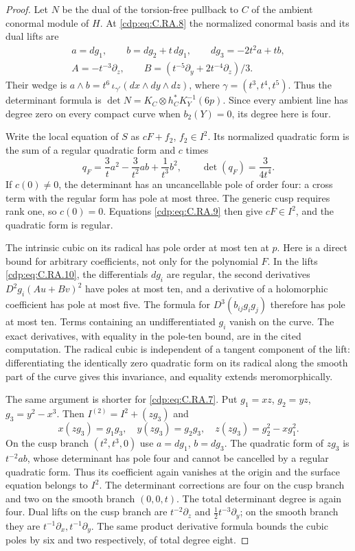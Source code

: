 \begin{proof}
Let $N$ be the dual of the torsion-free pullback to $C$ of
the ambient conormal module of $H$. At \eqref{cdp:eq:C.RA.8} the
normalized conormal basis and its dual lifts are
\[
\begin{gathered}
 a=dg_1,\qquad b=dg_2+t\,dg_1,\qquad
 dg_3=-2t^2a+tb,\\
 A=-t^{-3}\partial_z,\qquad
 B=(t^{-5}\partial_y+2t^{-4}\partial_z)/3 .
\end{gathered}                                  \tag{C.RA.10}\label{cdp:eq:C.RA.10}
\]
Their wedge is $a\wedge b=t^6\,\iota_{\gamma'}(dx\wedge
dy\wedge dz)$, where $\gamma=(t^3,t^4,t^5)$.
Thus the determinant formula is
$\det N=K_C\otimes h_C^*K_Y^{-1}(6p)$.
Since every ambient line has degree zero on every compact
curve when $b_2(Y)=0$, its degree here is four.

Write the local equation of $S$ as $cF+f_2$, $f_2\in I^2$.
Its normalized quadratic form is the sum of a regular
quadratic form and $c$ times
\[
 q_F=\frac3t a^2-\frac3{t^2}ab+\frac1{t^3}b^2,
 \qquad \det(q_F)=\frac3{4t^4}.                  \tag{C.RA.11}\label{cdp:eq:C.RA.11}
\]
If $c(0)\ne0$, the determinant has an uncancellable
pole of order four: a cross term with the regular form
has pole at most three. The generic cusp requires rank
one, so $c(0)=0$. Equations \eqref{cdp:eq:C.RA.9} then give
$cF\in I^2$, and the quadratic form is regular.

The intrinsic cubic on its radical has pole order at most
ten at $p$. Here is a direct bound for arbitrary coefficients,
not only for the polynomial $F$. In the lifts \eqref{cdp:eq:C.RA.10},
the differentials $dg_i$ are regular, the second derivatives
$D^2g_i(Au+Bv)^2$ have poles at most ten, and a derivative
of a holomorphic coefficient has pole at most five.
The formula for $D^3(b_{ij}g_i g_j)$ therefore has pole
at most ten. Terms containing an undifferentiated $g_i$
vanish on the curve. The exact derivatives, with equality
in the pole-ten bound, are in the cited computation.
The radical cubic is independent of a tangent component
of the lift: differentiating the identically zero quadratic
form on its radical along the smooth part of the curve
gives this invariance, and equality extends meromorphically.

The same argument is shorter for \eqref{cdp:eq:C.RA.7}. Put
$g_1=xz$, $g_2=yz$, $g_3=y^2-x^3$. Then
$I^{(2)}=I^2+(z g_3)$ and
\[
 x(zg_3)=g_1g_3,\quad y(zg_3)=g_2g_3,\quad
 z(zg_3)=g_2^2-xg_1^2.
 \tag{C.RA.12}\label{cdp:eq:C.RA.12}
\]
On the cusp branch $(t^2,t^3,0)$ use $a=dg_1$, $b=dg_3$.
The quadratic form of $z g_3$ is $t^{-2}ab$, whose
determinant has pole four and cannot be cancelled by a
regular quadratic form. Thus its coefficient again
vanishes at the origin and the surface equation belongs
to $I^2$. The determinant corrections are four on the
cusp branch and two on the smooth branch $(0,0,t)$.
The total determinant degree is again four.
Dual lifts on the cusp branch are
$t^{-2}\partial_z$ and $\frac12t^{-3}\partial_y$;
on the smooth branch they are
$t^{-1}\partial_x,t^{-1}\partial_y$.
The same product derivative formula bounds the cubic
poles by six and two respectively, of total degree eight.


\end{proof}

